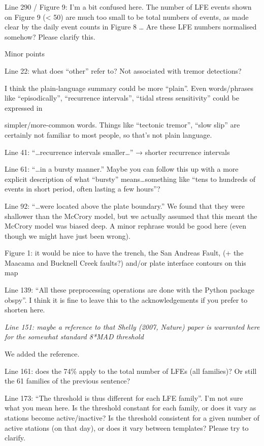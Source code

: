 \documentclass[letterpaper, 12pt]{article}
\begin{document}
\bigskip

Line 290 / Figure 9: I’m a bit confused here. The number of LFE events shown on Figure 9 (< 50) are much too small to be total numbers of events, as made clear by the daily event counts in Figure 8 … Are these LFE numbers normalised somehow? Please clarify this. 

Minor points

Line 22: what does “other” refer to? Not associated with tremor detections? 

I think the plain-language summary could be more “plain”. Even words/phrases like “episodically”, “recurrence intervals”, “tidal stress sensitivity” could be expressed in 


simpler/more-common words. Things like “tectonic tremor”, “slow slip” are certainly not familiar to most people, so that’s not plain language. 

Line 41: “…recurrence intervals smaller…” → shorter recurrence intervals 

Line 61: “…in a bursty manner.” Maybe you can follow this up with a more explicit description of what “bursty” means…something like “tens to hundreds of events in short period, often lasting a few hours”? 

Line 92: “…were located above the plate boundary.” We found that they were shallower than the McCrory model, but we actually assumed that this meant the McCrory model was biased deep. A minor rephrase would be good here (even though we might have just been wrong). 

Figure 1: it would be nice to have the trench, the San Andreas Fault, (+ the Maacama and Bucknell Creek faults?) and/or plate interface contours on this map 

Line 139: “All these preprocessing operations are done with the Python package obspy”. I think it is fine to leave this to the acknowledgements if you prefer to shorten here. 

\bigskip

\textit{Line 151: maybe a reference to that Shelly (2007, Nature) paper is warranted here for the somewhat standard 8*MAD threshold}

We added the reference.

\bigskip

Line 161: does the 74\% apply to the total number of LFEs (all families)? Or still the 61 families of the previous sentence? 

Line 173: “The threshold is thus different for each LFE family”. I’m not sure what you mean here. Is the threshold constant for each family, or does it vary as stations become active/inactive? Is the threshold consistent for a given number of active stations (on that day), or does it vary between templates? Please try to clarify. 
\end{document}

